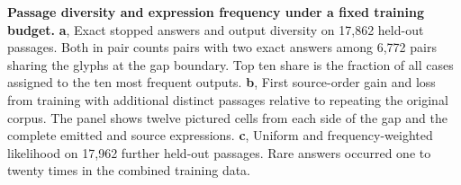 \textbf{Passage diversity and expression frequency under a fixed training budget.}
\textbf{a}, Exact stopped answers and output diversity on 17,862 held-out passages. Both in pair counts pairs with two exact answers among 6,772 pairs sharing the glyphs at the gap boundary. Top ten share is the fraction of all cases assigned to the ten most frequent outputs.
\textbf{b}, First source-order gain and loss from training with additional distinct passages relative to repeating the original corpus. The panel shows twelve pictured cells from each side of the gap and the complete emitted and source expressions.
\textbf{c}, Uniform and frequency-weighted likelihood on 17,962 further held-out passages. Rare answers occurred one to twenty times in the combined training data.
